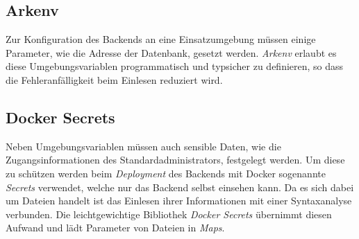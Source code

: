 \subsection{Arkenv}
\label{subsec:backend:bibs:arkenv}
Zur Konfiguration des Backends an eine Einsatzumgebung müssen einige Parameter, wie die Adresse der Datenbank, gesetzt werden.
\textit{Arkenv} erlaubt es diese Umgebungsvariablen programmatisch und typsicher zu definieren, so dass die Fehleranfälligkeit beim Einlesen reduziert wird.

\subsection{Docker Secrets}
\label{subsec:backend:bibs:dockersecrets}
Neben Umgebungsvariablen müssen auch sensible Daten, wie die Zugangsinformationen des Standardadministrators, festgelegt werden.
Um diese zu schützen werden beim \textit{Deployment} des Backends mit Docker sogenannte \textit{Secrets} verwendet, welche nur das Backend selbst einsehen kann.
Da es sich dabei um Dateien handelt ist das Einlesen ihrer Informationen mit einer Syntaxanalyse verbunden.
Die leichtgewichtige Bibliothek \textit{Docker Secrets} übernimmt diesen Aufwand und lädt Parameter von Dateien in \textit{Maps}.

